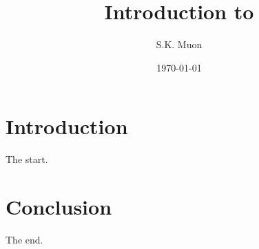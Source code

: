 \documentclass[a4paper, 11pt]{article}
\author{S.K. Muon}
\title{Introduction to \LaTex}
\date{\today}
\begin{document}
	\maketitle
	\section{Introduction}
		The start.
	\section{Conclusion}
		The end.
\end{document}
